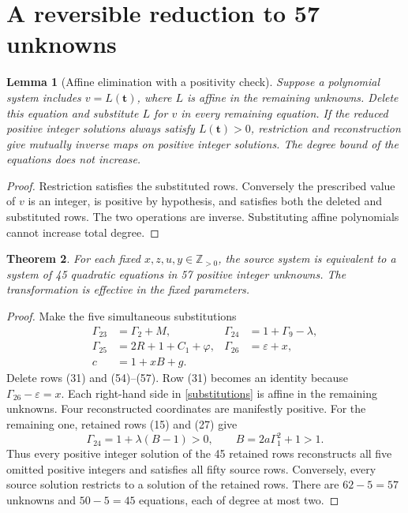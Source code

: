 \documentclass[11pt]{article}
\newtheorem{theorem}{Theorem}
\newtheorem{lemma}[theorem]{Lemma}
\newcommand{\Np}{\mathbb Z_{>0}}
\begin{document}
\section{A reversible reduction to 57 unknowns}
\begin{lemma}[Affine elimination with a positivity check]
Suppose a polynomial system includes \(v=L(\mathbf t)\), where \(L\)
is affine in the remaining unknowns. Delete this equation and substitute
\(L\) for \(v\) in every remaining equation. If the reduced positive
integer solutions always satisfy \(L(\mathbf t)>0\), restriction and
reconstruction give mutually inverse maps on positive integer solutions.
The degree bound of the equations does not increase.
\end{lemma}
\begin{proof}
Restriction satisfies the substituted rows. Conversely the prescribed
value of \(v\) is an integer, is positive by hypothesis, and satisfies
both the deleted and substituted rows. The two operations are inverse.
Substituting affine polynomials cannot increase total degree.
\end{proof}

\begin{theorem}\label{thm5745}
For each fixed \(x,z,u,y\in\Np\), the source system is equivalent to a
system of 45 quadratic equations in 57 positive integer unknowns. The
transformation is effective in the fixed parameters.
\end{theorem}
\begin{proof}
Make the five simultaneous substitutions
\begin{equation}\label{substitutions}
\begin{aligned}
\Gamma_{23}&=\Gamma_2+M,&
\Gamma_{24}&=1+\Gamma_9-\lambda,\\
\Gamma_{25}&=2R+1+C_1+\varphi,&
\Gamma_{26}&=\varepsilon+x,\\
c&=1+xB+g.
\end{aligned}
\end{equation}
Delete rows (31) and (54)--(57). Row (31) becomes an identity because
\(\Gamma_{26}-\varepsilon=x\). Each right-hand side in
\eqref{substitutions} is affine in the remaining unknowns.
Four reconstructed coordinates are manifestly positive. For the remaining
one, retained rows (15) and (27) give
\[
\Gamma_{24}=1+\lambda(B-1)>0,
\qquad B=2a\Gamma_1^2+1>1.
\]
Thus every positive integer solution of the 45 retained rows reconstructs
all five omitted positive integers and satisfies all fifty source rows.
Conversely, every source solution restricts to a solution of the retained
rows. There are \(62-5=57\) unknowns and \(50-5=45\) equations, each of
degree at most two.
\end{proof}
\end{document}
